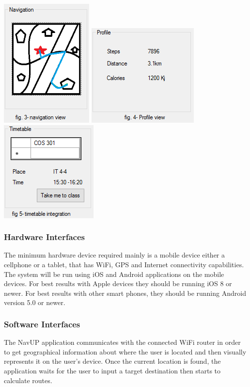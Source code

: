 \documentclass[a4paper,12pt]{article}
\begin{document}
\includegraphics[scale=1]{images/user_three.PNG}
\includegraphics[scale=1]{images/user_four.PNG}
\includegraphics[scale=1]{images/user_five.PNG}\\
\subsubsection{Hardware Interfaces}
The minimum hardware device required mainly is a mobile device either a cellphone or a tablet, that has WiFi, GPS and Internet connectivity capabilities. The system will be run using iOS and Android applications on the mobile devices. For best results with Apple devices they should be running iOS 8 or newer. For best results with other smart phones, they should be running Android version 5.0 or newer. 
\subsubsection{Software Interfaces}
The NavUP application communicates with the connected WiFi router in order to get geographical information about where the user is located and then visually represents it on the user's device. Once the current location is found, the application waits for the user to input a target destination then starts to calculate routes. 
\end{document}
